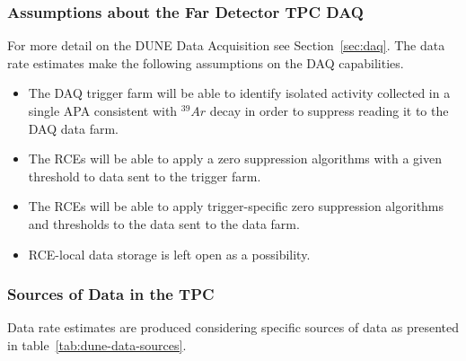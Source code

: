 \subsubsection{Assumptions about the Far Detector TPC DAQ}
For more detail on the DUNE Data Acquisition see Section~\ref{sec:daq}.
The data rate estimates make the following assumptions on the DAQ capabilities.


\begin{itemize}
\item The DAQ trigger farm will be able to identify isolated activity
  collected in a single APA consistent with $^{39}Ar$ decay in order
  to suppress reading it to the DAQ data farm.
\item The RCEs will be able to apply a zero suppression
  algorithms with a given threshold to data sent to the trigger farm.
\item The RCEs will be able to apply trigger-specific zero suppression
  algorithms and thresholds to the data sent to the data farm.
\item RCE-local data storage is left open as a possibility.
\end{itemize}

\subsubsection{Sources of Data in the TPC}

Data rate estimates are produced considering specific sources of
data as presented in table~\ref{tab:dune-data-sources}.


